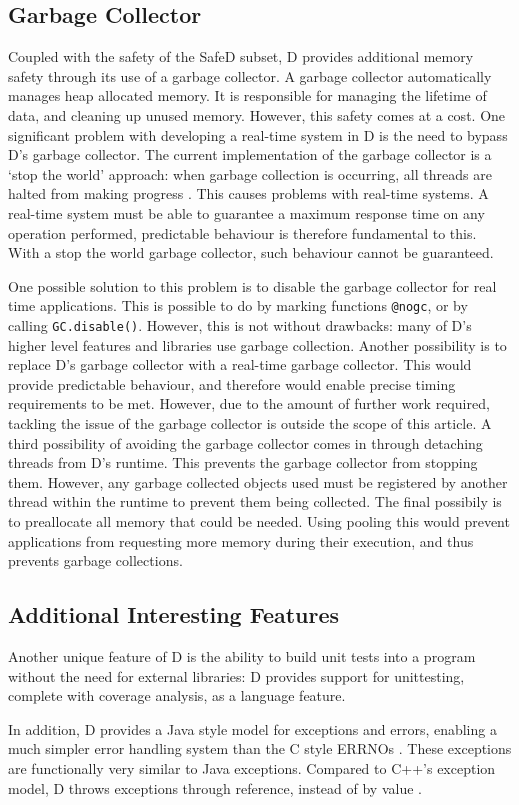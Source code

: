 \subsection{Garbage Collector}
Coupled with the safety of the SafeD subset, D provides additional memory
safety through its use of a garbage collector. A garbage collector
automatically manages heap allocated memory. It is responsible for managing
the lifetime of data, and cleaning up unused memory. 
However, this safety comes at a cost. One significant problem with developing a 
real-time system in D is the need to bypass D's garbage collector. 
The current implementation of the garbage 
collector is a `stop the world' approach: when garbage collection is occurring, 
all threads are halted from making progress 
\cite{dlang-garbage}. This causes problems with 
real-time systems. A real-time system must be able to guarantee a maximum response 
time on any operation performed, predictable behaviour is therefore fundamental to this. 
With a stop the world garbage collector, such behaviour cannot be guaranteed. 
\par\bigskip\noindent
One possible solution to this problem is to disable the garbage collector for 
real time applications. This is possible to do by marking functions \texttt{@nogc}, 
or by calling \texttt{GC.disable()}. However, this is not without drawbacks: 
many of D's higher level features and libraries use garbage collection. 
Another possibility is to replace D's garbage collector with a real-time 
garbage collector. This would provide predictable behaviour, and therefore
would enable precise timing requirements to be met.
However, due to the amount of further work required, tackling the issue of the garbage 
collector is outside the scope of this article.
A third possibility of avoiding the garbage collector comes in through
detaching threads from D's runtime. This prevents the garbage collector from
stopping them. However, any garbage collected objects used must be registered
by another thread within the runtime to prevent them being collected. 
The final possibily is to preallocate all memory that could be needed. Using
pooling this would prevent applications from requesting more memory during
their execution, and thus prevents garbage collections. 

\subsection{Additional Interesting Features}
Another unique feature of D is the ability to build unit tests into a 
program without the need for external libraries: D provides support for 
unittesting, complete with coverage analysis, as a language feature. 
\par\bigskip\noindent
In addition, D provides a Java style model for exceptions and errors, enabling 
a much simpler error handling system than the C style ERRNOs 
\cite{ddili-book}. 
These exceptions are functionally very similar to Java exceptions. Compared to
C++'s exception model, D throws exceptions through reference, instead of by
value \cite{interface-to-cpp}. 

